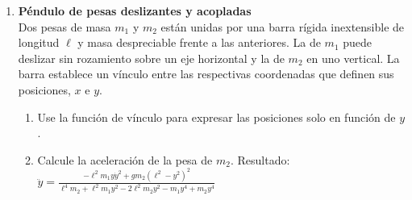 \documentclass[11pt, spanish, a4paper, twoside]{article}
\begin{document}
\begin{enumerate}
	\item 
	\begin{minipage}[t][2.3cm]{0.75\textwidth}
		\textbf{Péndulo de pesas deslizantes y acopladas}\\ 
		Dos pesas de masa \(m_1\) y \(m_2\) están unidas por una barra rígida inextensible de longitud \(\ell\) y masa despreciable frente a las anteriores.
		La de \(m_1\) puede deslizar sin rozamiento sobre un eje horizontal y la de \(m_2\) en uno vertical.
		La barra establece un vínculo entre las respectivas coordenadas que definen sus posiciones, \(x\) e \(y\).
	\end{minipage}
	\begin{minipage}[c][1cm][t]{0.25\textwidth}
		
	\end{minipage}
	\begin{enumerate}
		\item Use la función de vínculo para expresar las posiciones solo en función de \(y\).
		\item Calcule la aceleración de la pesa de \(m_2\). %
		Resultado:
			$\ddot{y} = \frac{- \ell^{2} m_{1} y \dot{y}^{2} + g m_{2} \left(\ell^{2} - y^{2}\right)^{2}}{\ell^{4} m_{2} + \ell^{2} m_{1} y^{2} - 2 \ell^{2} m_{2} y^{2} - m_{1} y^{4} + m_{2} y^{4}}$
			\qquad
	\end{enumerate}
	


\end{enumerate}
\end{document}
